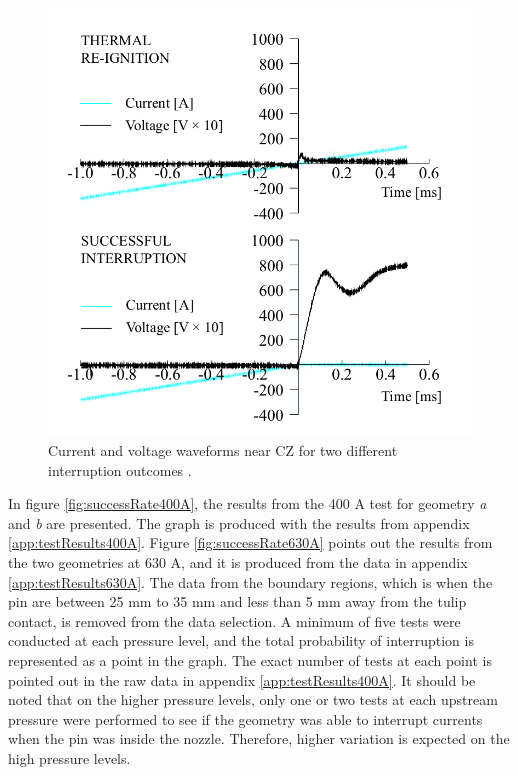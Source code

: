 \documentclass[10pt,a4paper,twoside]{article}
\begin{document}
\begin{figure}[H]
\centering
\includegraphics[scale=0.28]{Bilder/Results/differentInterruptions.png}
\caption{Current and voltage waveforms near CZ for two different interruption outcomes \cite{bib:AFIMVLBA}.} \label{fig:CurrentAndVoltageWaveform}
\end{figure}

In figure \ref{fig:successRate400A}, the results from the 400 A test for geometry \textit{a} and \textit{b} are presented. The graph is produced with the results from appendix \ref{app:testResults400A}. Figure \ref{fig:successRate630A} points out the results from the two geometries at 630 A, and it is produced from the data in appendix \ref{app:testResults630A}. The data from the boundary regions, which is when the pin are between 25 mm to 35 mm and less than 5 mm away from the tulip contact, is removed from the data selection. A minimum of five tests were conducted at each pressure level, and the total probability of interruption is represented as a point in the graph. The exact number of tests at each point is pointed out in the raw data in appendix \ref{app:testResults400A}. It should be noted that on the higher pressure levels, only one or two tests at each upstream pressure were performed to see if the geometry was able to interrupt currents when the pin was inside the nozzle. Therefore, higher variation is expected on the high pressure levels. 
\end{document}
